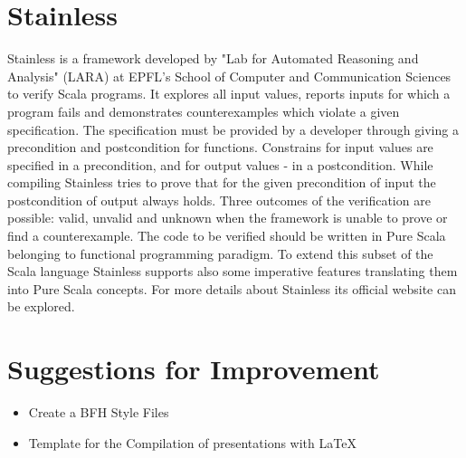 
\section{Stainless}
\label{sec:stainless}

Stainless is a framework developed by "Lab for Automated Reasoning and Analysis" (LARA) at EPFL's School of Computer and Communication Sciences to verify Scala programs.
It explores all input values, reports inputs for which a program fails and demonstrates counterexamples which violate a given specification.
The specification must be provided by a developer through giving a precondition and postcondition for functions. Constrains for input values are specified in a precondition, and for output values - in a postcondition. 
While compiling Stainless tries to prove that for the given precondition of input the postcondition of output always holds.
Three outcomes of the verification are possible: valid, unvalid and unknown when the framework is unable to prove or find a counterexample.
The code to be verified should be written in Pure Scala belonging to functional programming paradigm. To extend this subset of the Scala language Stainless supports also some imperative features translating them into Pure Scala concepts.
For more details about Stainless its official website can be explored. \cite{Stainless}



\section{Suggestions for Improvement}
\label{sec:introduction_suggestions}

\begin{itemize}
	\item Create a BFH Style Files
	\item Template for the Compilation of presentations with \LaTeX{}
\end{itemize}


